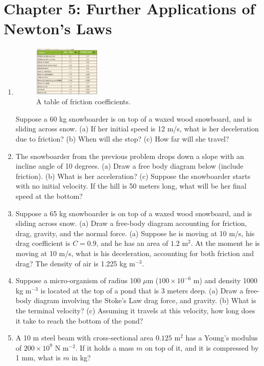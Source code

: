 \documentclass[10pt]{article}
\begin{document}
\section{Chapter 5: Further Applications of Newton's Laws}

\begin{enumerate}
\item 
\begin{figure}
\centering
\includegraphics[width=0.3\textwidth]{friction2.png}
\caption{\label{fig:fric} A table of friction coefficients.}
\end{figure} 
Suppose a 60 kg snowboarder is on top of a waxed wood snowboard, and is sliding across snow.  (a) If her initial speed is 12 m/s, what is her deceleration due to friction?  (b) When will she stop?  (c) How far will she travel? \\ \vspace{2.0cm}
\item The snowboarder from the previous problem drops down a slope with an incline angle of 10 degrees.  (a) Draw a free body diagram below (include friction).  (b) What is her acceleration?  (c) Suppose the snowboarder starts with no initial velocity.  If the hill is 50 meters long, what will be her final speed at the bottom? \\ \vspace{2.0cm}
\item Suppose a 65 kg snowboarder is on top of a waxed wood snowboard, and is sliding across snow.  (a) Draw a free-body diagram accounting for friction, drag, gravity, and the normal force.  (a) Suppose he is moving at 10 m/s, his drag coefficient is $C = 0.9$, and he has an area of $1.2$ m$^2$.  At the moment he is moving at 10 m/s, what is his deceleration, accounting for both friction and drag?  The density of air is 1.225 kg m$^{-3}$. \\ \vspace{2.5cm}
\item Suppose a micro-organism of radius 100 $\mu$m ($100 \times 10^{-6}$ m) and density 1000 kg m$^{-3}$ is located at the top of a pond that is 3 meters deep.  (a) Draw a free-body diagram involving the Stoke's Law drag force, and gravity.  (b) What is the terminal velocity?  (c) Assuming it travels at this velocity, how long does it take to reach the bottom of the pond? \\ \vspace{2cm}
\item A 10 m steel beam with cross-sectional area $0.125$ m$^2$ has a Young's modulus of $200 \times 10^9$ N m$^{-2}$.  If it holds a mass $m$ on top of it, and it is compressed by 1 mm, what is $m$ in kg?
\end{enumerate}
\end{document}

